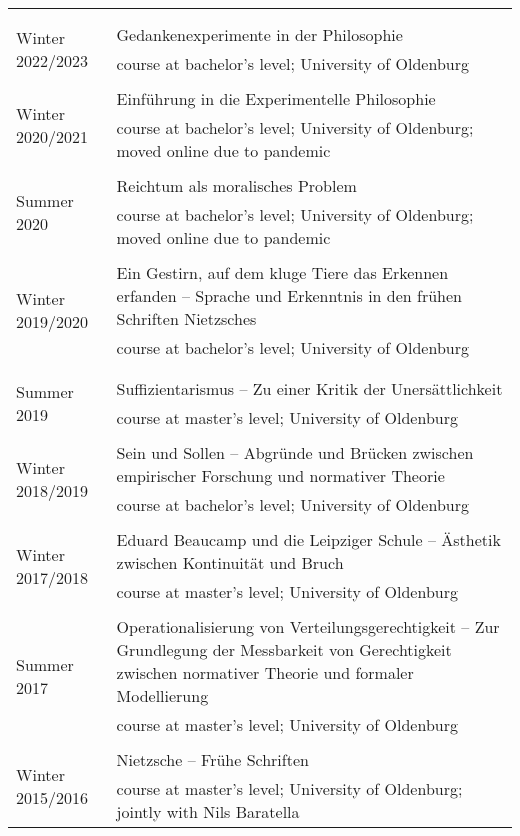 \documentclass[a4paper,10pt]{article}
\begin{document}
\begin{longtable}{p{2.5cm}p{11cm}}
\\
\\
\\
\multirow{2}{2.5cm}{\footnotesize{Winter 2022/2023}} & Gedankenexperimente in der Philosophie\\
& \footnotesize{course at bachelor's level; University of Oldenburg}\\
\\
\multirow{2}{2.5cm}{\footnotesize{Winter 2020/2021}} & Einführung in die Experimentelle Philosophie\\
& \footnotesize{course at bachelor's level; University of Oldenburg; moved online due to pandemic}\\
\\
\multirow{2}{2.5cm}{\footnotesize{Summer 2020}} & Reichtum als moralisches Problem\\
& \footnotesize{course at bachelor's level; University of Oldenburg; moved online due to pandemic}\\
\\
\multirow{2}{2.5cm}{\footnotesize{Winter 2019/2020}} & Ein Gestirn, auf dem kluge Tiere das Erkennen erfanden -- Sprache und Erkenntnis in den frühen Schriften Nietzsches\\
& \footnotesize{course at bachelor's level; University of Oldenburg}\\
\\
\\ %
\multirow{2}{2.5cm}{\footnotesize{Summer 2019}} & Suffizientarismus -- Zu einer Kritik der Unersättlichkeit\\
& \footnotesize{course at master's level; University of Oldenburg}\\
\\
\multirow{2}{2.5cm}{\footnotesize{Winter 2018/2019}} & Sein und Sollen -- Abgründe und Brücken zwischen empirischer Forschung und normativer Theorie\\
& \footnotesize{course at bachelor's level; University of Oldenburg}\\
\\
\multirow{2}{2.5cm}{\footnotesize{Winter 2017/2018}} & Eduard Beaucamp und die Leipziger Schule -- Ästhetik zwischen Kontinuität und Bruch\\
& \footnotesize{course at master's level; University of Oldenburg}\\
\\
\multirow{2}{2.5cm}{\footnotesize{Summer 2017}} & Operationalisierung von Verteilungsgerechtigkeit -- Zur Grundlegung der Messbarkeit von Gerechtigkeit zwischen normativer Theorie und formaler Modellierung\\
& \footnotesize{course at master's level; University of Oldenburg}\\
\\
\multirow{2}{2.5cm}{\footnotesize{Winter 2015/2016}} & Nietzsche -- Frühe Schriften\\
& \footnotesize{course at master's level; University of Oldenburg; jointly with Nils Baratella}\\
\end{longtable}
\end{document}
